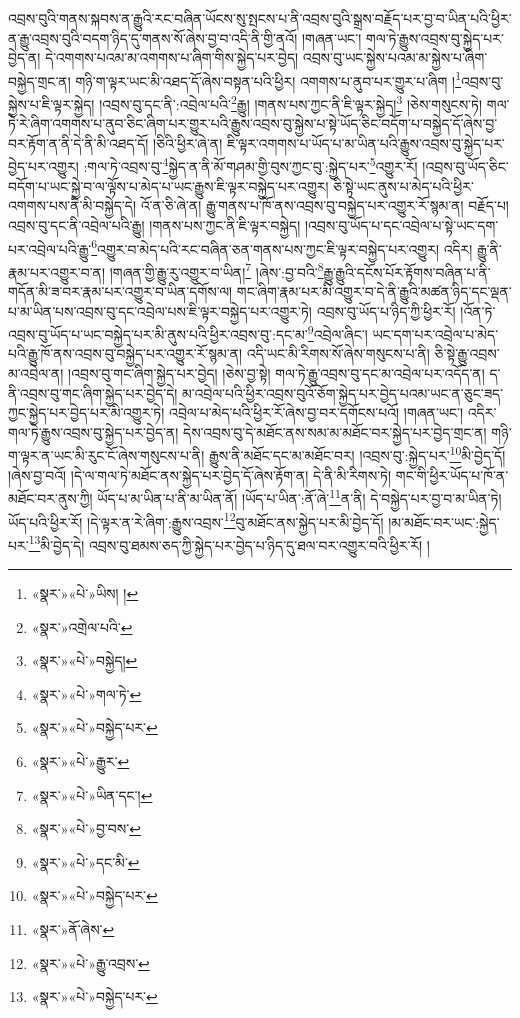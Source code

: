 འབྲས་བུའི་གནས་སྐབས་ན་རྒྱུའི་རང་བཞིན་ཡོངས་སུ་སྤངས་པ་ནི་འབྲས་བུའི་སྒྲས་བརྗོད་པར་བྱ་བ་ཡིན་པའི་ཕྱིར་ན་རྒྱུ་འབྲས་བུའི་བདག་ཉིད་དུ་གནས་སོ་ཞེས་བྱ་བ་འདི་ནི་གྱི་ནའོ། །གཞན་ཡང་། གལ་ཏེ་རྒྱུས་འབྲས་བུ་སྐྱེད་པར་བྱེད་ན། དེ་འགགས་པའམ་མ་འགགས་པ་ཞིག་གིས་སྐྱེད་པར་བྱེད། འབྲས་བུ་ཡང་སྐྱེས་པའམ་མ་སྐྱེས་པ་ཞིག་བསྐྱེད་གྲང་ན། གཉི་ག་ལྟར་ཡང་མི་འཐད་དོ་ཞེས་བསྟན་པའི་ཕྱིར། འགགས་པ་ནུབ་པར་གྱུར་པ་ཞིག །\footnote{«སྣར་»«པེ་»ཡིས། །}འབྲས་བུ་སྐྱེས་པ་ཇི་ལྟར་སྐྱེད། །འབྲས་བུ་དང་ནི་:འབྲེལ་པའི་\footnote{«སྣར་»འགྲེལ་པའི་}རྒྱུ། །གནས་པས་ཀྱང་ནི་ཇི་ལྟར་སྐྱེད།\footnote{«སྣར་»«པེ་»བསྐྱེད།} །ཅེས་གསུངས་ཏེ། གལ་ཏེ་རེ་ཞིག་འགགས་པ་ནུབ་ཅིང་ཞིག་པར་གྱུར་པའི་རྒྱུས་འབྲས་བུ་སྐྱེས་པ་སྟེ་ཡོད་ཅིང་བདོག་པ་བསྐྱེད་དོ་ཞེས་བྱ་བར་རྟོག་ན་ནི་དེ་ནི་མི་འཐད་དོ། །ཅིའི་ཕྱིར་ཞེ་ན། ཇི་ལྟར་འགགས་པ་ཡོད་པ་མ་ཡིན་པའི་རྒྱུས་འབྲས་བུ་སྐྱེད་པར་བྱེད་པར་འགྱུར། :གལ་ཏེ་འབྲས་བུ་\footnote{«སྣར་»«པེ་»གལ་ཏེ་}སྐྱེད་ན་ནི་མོ་གཤམ་གྱི་བུས་ཀྱང་བུ་:སྐྱེད་པར་\footnote{«སྣར་»«པེ་»བསྐྱེད་པར་}འགྱུར་རོ། །འབྲས་བུ་ཡོད་ཅིང་བདོག་པ་ཡང་སྐྱེ་བ་ལ་ལྟོས་པ་མེད་པ་ཡང་རྒྱུས་ཇི་ལྟར་བསྐྱེད་པར་འགྱུར། ཅི་སྟེ་ཡང་ནུས་པ་མེད་པའི་ཕྱིར་འགགས་པས་ནི་མི་བསྐྱེད་དེ། འོ་ན་ཅི་ཞེ་ན། རྒྱུ་གནས་པ་ཁོ་ནས་འབྲས་བུ་བསྐྱེད་པར་འགྱུར་རོ་སྙམ་ན། བརྗོད་པ། འབྲས་བུ་དང་ནི་འབྲེལ་པའི་རྒྱུ། །གནས་པས་ཀྱང་ནི་ཇི་ལྟར་བསྐྱེད། །འབྲས་བུ་ཡོད་པ་དང་འབྲེལ་པ་སྟེ་ཡང་དག་པར་འབྲེལ་པའི་རྒྱུ་\footnote{«སྣར་»«པེ་»རྒྱུར་}འགྱུར་བ་མེད་པའི་རང་བཞིན་ཅན་གནས་པས་ཀྱང་ཇི་ལྟར་བསྐྱེད་པར་འགྱུར། འདིར། རྒྱུ་ནི་རྣམ་པར་འགྱུར་བ་ན། །གཞན་གྱི་རྒྱུ་རུ་འགྱུར་བ་ཡིན།\footnote{«སྣར་»«པེ་»ཡིན་དང་།} །ཞེས་:བྱ་བའི་\footnote{«སྣར་»«པེ་»བྱ་བས་}རྒྱུ་རྒྱུའི་དངོས་པོར་རྟོགས་བཞིན་པ་ནི་གདོན་མི་ཟ་བར་རྣམ་པར་འགྱུར་བ་ཡིན་དགོས་ལ། གང་ཞིག་རྣམ་པར་མི་འགྱུར་བ་དེ་ནི་རྒྱུའི་མཚན་ཉིད་དང་ལྡན་པ་མ་ཡིན་པས་འབྲས་བུ་དང་འབྲེལ་པས་ཇི་ལྟར་བསྐྱེད་པར་འགྱུར་ཏེ། འབྲས་བུ་ཡོད་པ་ཉིད་ཀྱི་ཕྱིར་རོ། །འོན་ཏེ་འབྲས་བུ་ཡོད་པ་ཡང་བསྐྱེད་པར་མི་ནུས་པའི་ཕྱིར་འབྲས་བུ་:དང་མ་\footnote{«སྣར་»«པེ་»དང་མི་}འབྲེལ་ཞིང་། ཡང་དག་པར་འབྲེལ་པ་མེད་པའི་རྒྱུ་ཁོ་ནས་འབྲས་བུ་བསྐྱེད་པར་འགྱུར་རོ་སྙམ་ན། འདི་ཡང་མི་རིགས་སོ་ཞེས་གསུངས་པ་ནི། ཅི་སྟེ་རྒྱུ་འབྲས་མ་འབྲེལ་ན། །འབྲས་བུ་གང་ཞིག་སྐྱེད་པར་བྱེད། །ཅེས་བྱ་སྟེ། གལ་ཏེ་རྒྱུ་འབྲས་བུ་དང་མ་འབྲེལ་པར་འདོད་ན། ད་ནི་འབྲས་བུ་གང་ཞིག་སྐྱེད་པར་བྱེད་དེ། མ་འབྲེལ་པའི་ཕྱིར་འབྲས་བུའོ་ཅོག་སྐྱེད་པར་བྱེད་པའམ་ཡང་ན་ཅུང་ཟད་ཀྱང་སྐྱེད་པར་བྱེད་པར་མི་འགྱུར་ཏེ། འབྲེལ་པ་མེད་པའི་ཕྱིར་རོ་ཞེས་བྱ་བར་དགོངས་པའོ། །གཞན་ཡང་། འདིར་གལ་ཏེ་རྒྱུས་འབྲས་བུ་སྐྱེད་པར་བྱེད་ན། དེས་འབྲས་བུ་དེ་མཐོང་ནས་སམ་མ་མཐོང་བར་སྐྱེད་པར་བྱེད་གྲང་ན། གཉི་ག་ལྟར་ན་ཡང་མི་རུང་ངོ་ཞེས་གསུངས་པ་ནི། རྒྱུས་ནི་མཐོང་དང་མ་མཐོང་བར། །འབྲས་བུ་:སྐྱེད་པར་\footnote{«སྣར་»«པེ་»བསྐྱེད་པར་}མི་བྱེད་དོ། །ཞེས་བྱ་བའོ། །དེ་ལ་གལ་ཏེ་མཐོང་ནས་སྐྱེད་པར་བྱེད་དོ་ཞེས་རྟོག་ན། དེ་ནི་མི་རིགས་ཏེ། གང་གི་ཕྱིར་ཡོད་པ་ཁོ་ན་མཐོང་བར་ནུས་ཀྱི། ཡོད་པ་མ་ཡིན་པ་ནི་མ་ཡིན་ནོ། །ཡོད་པ་ཡིན་:ནོ་ཞེ་\footnote{«སྣར་»ནོ་ཞེས་}ན་ནི། དེ་བསྐྱེད་པར་བྱ་བ་མ་ཡིན་ཏེ། ཡོད་པའི་ཕྱིར་རོ། །དེ་ལྟར་ན་རེ་ཞིག་:རྒྱུས་འབྲས་\footnote{«སྣར་»«པེ་»རྒྱུ་འབྲས་}བུ་མཐོང་ནས་སྐྱེད་པར་མི་བྱེད་དོ། །མ་མཐོང་བར་ཡང་:སྐྱེད་པར་\footnote{«སྣར་»«པེ་»བསྐྱེད་པར་}མི་བྱེད་དེ། འབྲས་བུ་ཐམས་ཅད་ཀྱི་སྐྱེད་པར་བྱེད་པ་ཉིད་དུ་ཐལ་བར་འགྱུར་བའི་ཕྱིར་རོ། །
